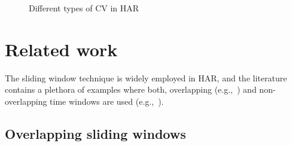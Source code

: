 \begin{figure}[htp]
  \centering
  \quad
   \caption{Different types of CV in HAR}
    \label{fig:CVs}
\end{figure}
\section{Related work}
The sliding window technique is widely employed in HAR, and the literature contains a plethora of examples where both, overlapping (e.g.,~\cite{bao2004activity,tapia2007real,lara2012centinela,morris2014recofit}) and non-overlapping time windows are used (e.g.,~\cite{minnen2007recognizing,reddy2010using,cheng2010active,banos2014window}).
\subsection{Overlapping sliding windows}

